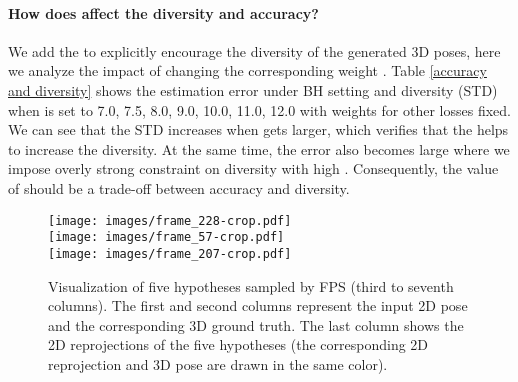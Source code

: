 \documentclass{bmvc2k}
\begin{document}
\paragraph{How does  affect the diversity and accuracy?} We add the  to explicitly encourage the diversity of the generated 3D poses, here we analyze the impact of
changing the corresponding weight . Table \ref{accuracy and diversity} shows the estimation error under BH setting and diversity (STD) when  is set to 7.0, 7.5, 8.0, 9.0, 10.0, 11.0, 12.0 with weights for other losses fixed. We can see that the STD increases when   gets larger, which verifies that the  helps to increase the diversity. At the same time, the error also becomes large where we impose overly strong constraint on diversity with high . Consequently, the value of  should be a trade-off between accuracy and diversity.











\vspace{-3mm}
\begin{figure*}[h!]
\begin{center}
\texttt{[image: images/frame\_228-crop.pdf]}\\
\texttt{[image: images/frame\_57-crop.pdf]}\\
\texttt{[image: images/frame\_207-crop.pdf]}\\


\end{center}
\vspace{-6mm}
   \caption{Visualization of five hypotheses sampled by FPS (third to seventh columns). The first and second columns represent the input 2D pose and the corresponding 3D ground truth. The last column shows the 2D reprojections of the five hypotheses (the corresponding 2D reprojection and 3D pose are drawn in the same color).}
\label{fig:multi-hypotheses}
\end{figure*}
\end{document}
